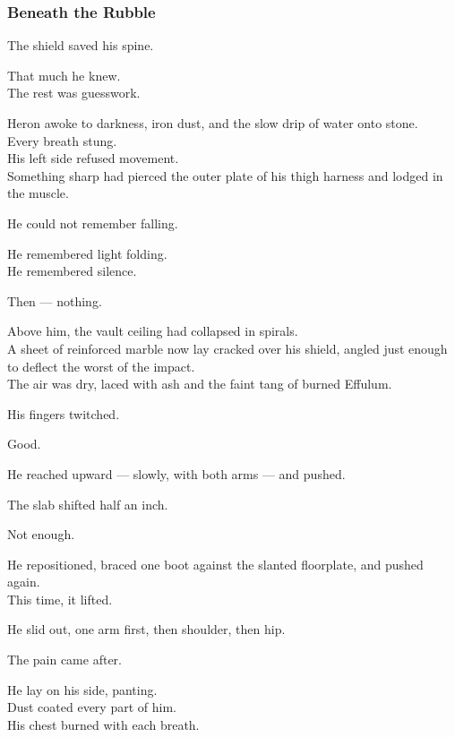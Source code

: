 \documentclass[12pt]{article}
\begin{document}
\subsubsection{Beneath the Rubble}

The shield saved his spine.

That much he knew.\\
The rest was guesswork.

Heron awoke to darkness, iron dust, and the slow drip of water onto stone.\\
Every breath stung.\\
His left side refused movement.\\
Something sharp had pierced the outer plate of his thigh harness and lodged in the muscle.

He could not remember falling.

He remembered light folding.\\
He remembered silence.

Then — nothing.

\vspace{1em}

Above him, the vault ceiling had collapsed in spirals.\\
A sheet of reinforced marble now lay cracked over his shield, angled just enough to deflect the worst of the impact.\\
The air was dry, laced with ash and the faint tang of burned Effulum.

His fingers twitched.

Good.

He reached upward — slowly, with both arms — and pushed.

The slab shifted half an inch.

Not enough.

\vspace{1em}

He repositioned, braced one boot against the slanted floorplate, and pushed again.\\
This time, it lifted.

He slid out, one arm first, then shoulder, then hip.

The pain came after.

\vspace{1em}

He lay on his side, panting.\\
Dust coated every part of him.\\
His chest burned with each breath.
\end{document}
